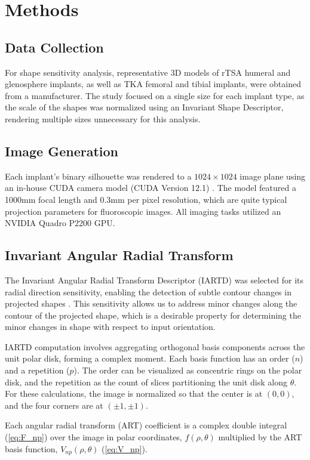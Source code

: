 \section{Methods}


\subsection{Data Collection}
For shape sensitivity analysis, representative 3D models of rTSA humeral and glenosphere implants, as well as TKA femoral and tibial implants, were obtained from a manufacturer.
The study focused on a single size for each implant type, as the scale of the shapes was normalized using an Invariant Shape Descriptor, rendering multiple sizes unnecessary for this analysis.
\subsection{Image Generation}
Each implant's binary silhouette was rendered to a $1024\times 1024$ image plane using an in-house CUDA camera model (CUDA Version 12.1) \cite{nickollsScalableParallelProgramming2008}.
The model featured a 1000mm focal length and 0.3mm per pixel resolution, which are quite typical projection parameters for fluoroscopic images.
All imaging tasks utilized an NVIDIA Quadro P2200 GPU.
\subsection{Invariant Angular Radial Transform}
The Invariant Angular Radial Transform Descriptor (IARTD) was selected for its radial direction sensitivity, enabling the detection of subtle contour changes in projected shapes \cite{leeNewShapeDescription2012}.
This sensitivity allows us to address minor changes along the contour of the projected shape, which is a desirable property for determining the minor changes in shape with respect to input orientation.

IARTD computation involves aggregating orthogonal basis components across the unit polar disk, forming a complex moment.
Each basis function has an order ($n$) and a repetition ($p$).
The order can be visualized as concentric rings on the polar disk, and the repetition as the count of slices partitioning the unit disk along $\theta$.
For these calculations, the image is normalized so that the center is at $(0,0)$, and the four corners are at $(\pm1,\pm1)$.

Each angular radial transform (ART) coefficient is a complex double integral (\cref{eq:F_np}) over the image in polar coordinates, $f(\rho,\theta)$ multiplied by the ART basis function, $V_{np}(\rho,\theta)$ (\cref{eq:V_np}).

